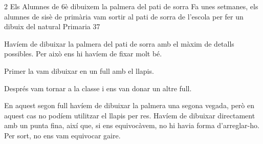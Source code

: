 \newpage
\begin{news}
{2} %
{Els Alumnes de 6è dibuixem la palmera del pati de sorra}
{Fa unes setmanes, els alumnes de sisè de primària vam sortir al pati de sorra de l’escola per fer un dibuix del natural}
{Primaria}
{37}


Havíem de dibuixar la palmera del pati de sorra amb el màxim de detalls possibles. Per això ens hi havíem de fixar molt bé.

Primer la vam dibuixar en un full amb el llapis.

Després vam tornar a la classe i ens van donar un altre full.

En aquest segon full havíem de dibuixar la palmera una segona vegada, però en aquest cas no podíem utilitzar el llapis per res. Havíem de dibuixar directament  amb un punta fina, així que, si ens equivocàvem,  no hi havia forma d’arreglar-ho. Per sort,  no ens vam equivocar gaire.

\end{news}

